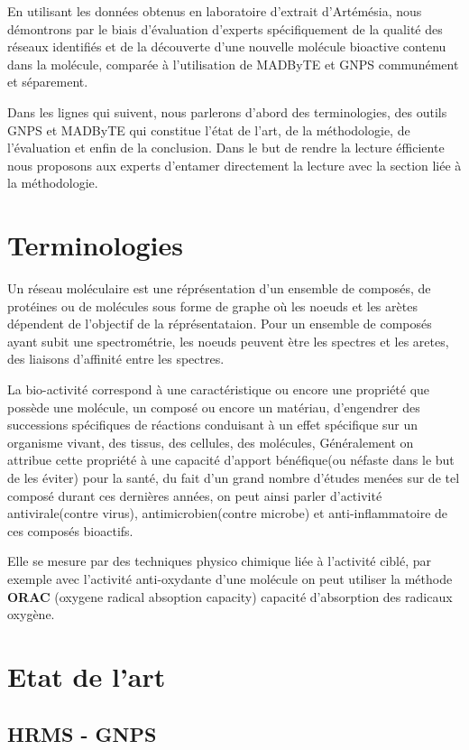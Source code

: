 \documentclass[letterpaper,twocolumn,10pt]{article}
\begin{document}
    En utilisant les données obtenus en laboratoire d'extrait d'Artémésia, nous démontrons par le biais d'évaluation d'experts spécifiquement de la qualité des réseaux identifiés et de la découverte d'une nouvelle molécule bioactive contenu dans la molécule, comparée à l'utilisation de MADByTE et GNPS communément et séparement.

    Dans les lignes qui suivent, nous parlerons d'abord des terminologies, des outils GNPS et MADByTE qui constitue l'état de l'art, de la méthodologie, de l'évaluation et enfin de la conclusion. Dans le but de rendre la lecture éfficiente nous proposons aux experts d'entamer directement la lecture avec la section liée à la méthodologie.

\section{Terminologies}

    Un réseau moléculaire est une réprésentation d'un ensemble de composés, de protéines ou de molécules sous forme de graphe où les noeuds et les arètes dépendent de l'objectif de la réprésentataion. Pour un ensemble de composés ayant subit une spectrométrie, les noeuds peuvent ètre les spectres et les aretes, des liaisons d'affinité entre les spectres.
        
    La bio-activité correspond à une caractéristique ou encore une propriété que possède une molécule, un composé ou encore un matériau, d’engendrer des successions spécifiques de réactions conduisant à un effet spécifique sur un organisme vivant, des tissus, des cellules, des molécules, Généralement on attribue cette propriété à une capacité d’apport bénéfique(ou néfaste dans le but de les éviter) pour la santé, du fait d'un grand nombre d'études menées sur de tel composé durant ces dernières années, on peut ainsi parler d’activité antivirale(contre virus), antimicrobien(contre microbe) et anti-inflammatoire de ces composés bioactifs.

    Elle se mesure par des techniques physico chimique liée à l’activité ciblé, par exemple avec l’activité anti-oxydante d’une molécule on peut utiliser la méthode \textbf{ORAC} (oxygene radical absoption capacity) capacité d’absorption des radicaux oxygène.

\section{Etat de l'art}
\subsection{HRMS - GNPS}
\end{document}
